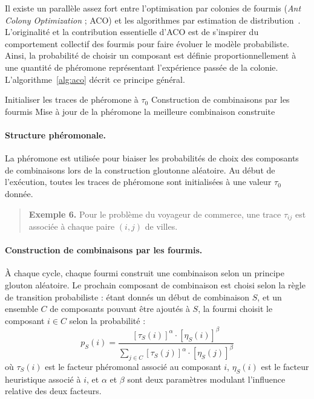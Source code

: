 \documentclass[12pt,a4paper]{book}
\begin{document}
Il existe un parallèle assez fort entre l'optimisation par colonies de fourmis (\textit{Ant Colony Optimization} ; ACO) et les algorithmes par estimation de distribution~\cite{zlochin2004}. L'originalité et la contribution essentielle d'ACO est de s'inspirer du comportement collectif des fourmis pour faire évoluer le modèle probabiliste. Ainsi, la probabilité de choisir un composant est définie proportionnellement à une quantité de phéromone représentant l'expérience passée de la colonie. L'algorithme~\ref{alg:aco} décrit ce principe général.

\begin{algorithm}[ht]
\caption{Optimisation par colonies de fourmis}
\label{alg:aco}
\begin{algorithmic}[1]
\State Initialiser les traces de phéromone à $\tau_0$
  \State Construction de combinaisons par les fourmis
  \State Mise à jour de la phéromone
\EndWhile
\State \Return la meilleure combinaison construite
\end{algorithmic}
\end{algorithm}

\paragraph{Structure phéromonale.}
La phéromone est utilisée pour biaiser les probabilités de choix des composants de combinaisons lors de la construction gloutonne aléatoire. Au début de l'exécution, toutes les traces de phéromone sont initialisées à une valeur $\tau_0$ donnée.

\begin{quote}
\textbf{Exemple 6.} Pour le problème du voyageur de commerce, une trace $\tau_{ij}$ est associée à chaque paire $(i, j)$ de villes.
\end{quote}

\paragraph{Construction de combinaisons par les fourmis.}
À chaque cycle, chaque fourmi construit une combinaison selon un principe glouton aléatoire. Le prochain composant de combinaison est choisi selon la règle de transition probabiliste : étant donnés un début de combinaison $S$, et un ensemble $C$ de composants pouvant être ajoutés à $S$, la fourmi choisit le composant $i \in C$ selon la probabilité :
\begin{equation}
p_S(i) = \frac{[\tau_S(i)]^\alpha \cdot [\eta_S(i)]^\beta}{\sum_{j \in C} [\tau_S(j)]^\alpha \cdot [\eta_S(j)]^\beta}
\label{eq:aco}
\end{equation}
où $\tau_S(i)$ est le facteur phéromonal associé au composant $i$, $\eta_S(i)$ est le facteur heuristique associé à $i$, et $\alpha$ et $\beta$ sont deux paramètres modulant l'influence relative des deux facteurs.
\end{document}
